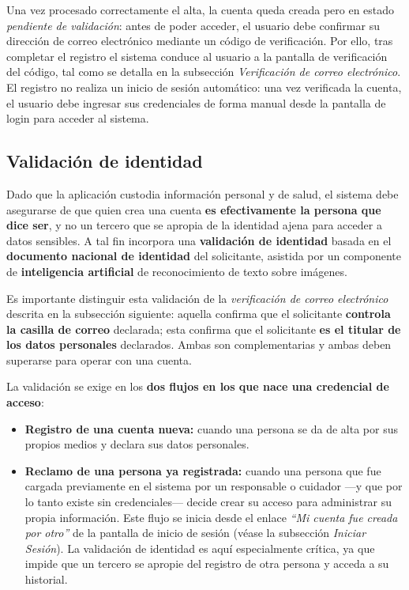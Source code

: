 \documentclass[a4paper,12pt]{article}
\begin{document}
    \par Una vez procesado correctamente el alta, la cuenta queda creada pero en estado \textit{pendiente de validación}: antes de poder acceder, el usuario debe confirmar su dirección de correo electrónico mediante un código de verificación. Por ello, tras completar el registro el sistema conduce al usuario a la pantalla de verificación del código, tal como se detalla en la subsección \textit{Verificación de correo electrónico}. El registro no realiza un inicio de sesión automático: una vez verificada la cuenta, el usuario debe ingresar sus credenciales de forma manual desde la pantalla de login para acceder al sistema.
    \subsection{Validación de identidad}
    \par Dado que la aplicación custodia información personal y de salud, el sistema debe asegurarse de que quien crea una cuenta \textbf{es efectivamente la persona que dice ser}, y no un tercero que se apropia de la identidad ajena para acceder a datos sensibles. A tal fin incorpora una \textbf{validación de identidad} basada en el \textbf{documento nacional de identidad} del solicitante, asistida por un componente de \textbf{inteligencia artificial} de reconocimiento de texto sobre imágenes.
    \par Es importante distinguir esta validación de la \textit{verificación de correo elec\-tró\-ni\-co} descrita en la subsección siguiente: aquella confirma que el solicitante \textbf{controla la casilla de correo} declarada; esta confirma que el solicitante \textbf{es el titular de los datos personales} declarados. Ambas son complementarias y ambas deben superarse para operar con una cuenta.
    \par La validación se exige en los \textbf{dos flujos en los que nace una credencial de acceso}:
    \begin{itemize}
        \item \textbf{Registro de una cuenta nueva:} cuando una persona se da de alta por sus propios medios y declara sus datos personales.
        \item \textbf{Reclamo de una persona ya registrada:} cuando una persona que fue cargada previamente en el sistema por un responsable o cuidador —y que por lo tanto existe sin credenciales— decide crear su acceso para administrar su propia información. Este flujo se inicia desde el enlace \textit{``Mi cuenta fue creada por otro''} de la pantalla de inicio de sesión (véase la subsección \textit{Iniciar Sesión}). La validación de identidad es aquí especialmente crítica, ya que impide que un tercero se apropie del registro de otra persona y acceda a su historial.
    \end{itemize}
\end{document}
